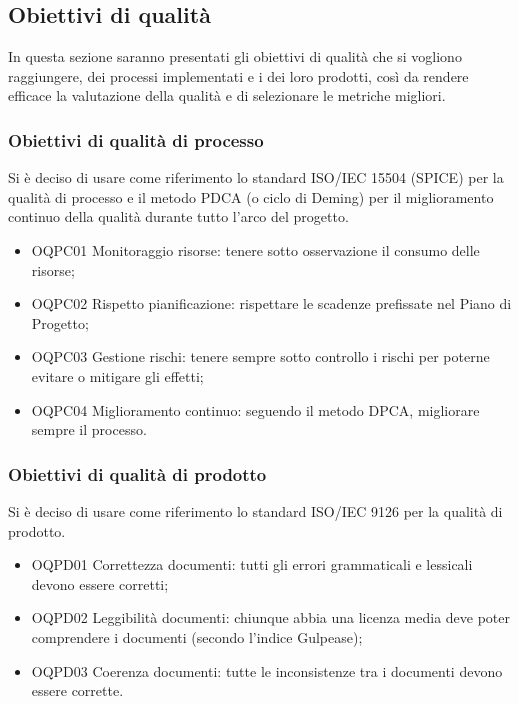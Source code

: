 \documentclass[../piano_di_qualifica.tex]{subfiles}
\begin{document}
\subsection{Obiettivi di qualità}
In questa sezione saranno presentati gli obiettivi di qualità che si vogliono raggiungere, dei processi implementati e i dei loro prodotti, così da rendere efficace la valutazione della qualità e di selezionare le metriche migliori.

\subsubsection{Obiettivi di qualità di processo}
Si è deciso di usare come riferimento lo standard ISO/IEC 15504 (SPICE) per la qualità di processo e il metodo PDCA (o ciclo di Deming) per il miglioramento continuo della qualità durante tutto l'arco del progetto.

\begin{itemize}
	\item OQPC01 Monitoraggio risorse: tenere sotto osservazione il consumo delle risorse;
	\item OQPC02 Rispetto pianificazione: rispettare le scadenze prefissate nel Piano di Progetto;
	\item OQPC03 Gestione rischi: tenere sempre sotto controllo i rischi per poterne evitare o mitigare gli effetti;
	\item OQPC04 Miglioramento continuo: seguendo il metodo DPCA, migliorare sempre il processo.
\end{itemize}

\subsubsection{Obiettivi di qualità di prodotto}
Si è deciso di usare come riferimento lo standard ISO/IEC 9126 per la qualità di prodotto. 

\begin{itemize}
	\item OQPD01 Correttezza documenti: tutti gli errori grammaticali e lessicali devono essere corretti;
	\item OQPD02 Leggibilità documenti: chiunque abbia una licenza media deve poter comprendere i documenti (secondo l'indice Gulpease);
	\item OQPD03 Coerenza documenti: tutte le inconsistenze tra i documenti devono essere corrette.
\end{itemize}
\end{document}

